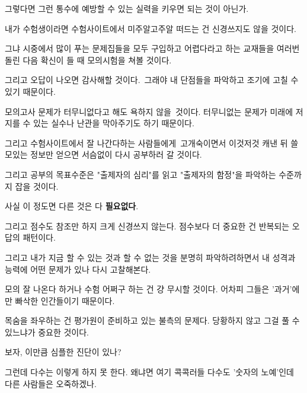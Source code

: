 그렇다면 그런 통수에 예방할 수 있는 실력을 키우면 되는 것이 아닌가.
\vspace{5mm}

내가 수험생이라면 수험사이트에서 미주알고주알 떠드는 건 신경쓰지도 않을 것이다.
\vspace{5mm}

그냐 시중에서 많이 푸는 문제집들을 모두 구입하고 어렵다라고 하는 교재들을 여러번 돌린 다음 확신이 들 때 모의시험을 쳐볼 것이다.
\vspace{5mm}

그리고 오답이 나오면 감사해할 것이다. 그래야 내 단점들을 파악하고 조기에 고칠 수 있기 때문이다.
\vspace{5mm}

모의고사 문제가 터무니없다고 해도 욕하지 않을 것이다. 터무니없는 문제가 미래에 저지를 수 있는 실수나 난관을 막아주기도 하기 때문이다.
\vspace{5mm}

그리고 수험사이트에서 잘 나간다하는 사람들에게 고개숙이면서 이것저것 캐낸 뒤 쓸모있는 정보만 얻으면 서슴없이 다시 공부하러 갈 것이다.
\vspace{5mm}

그리고 공부의 목표수준은 "출제자의 심리"를 읽고 "출제자의 함정"을 파악하는 수준까지 잡을 것이다.
\vspace{5mm}

사실 이 정도면 다른 것은 다 \textbf{필요없다}.
\vspace{5mm}

그리고 점수도 참조만 하지 크게 신경쓰지 않는다. 점수보다 더 중요한 건 반복되는 오답의 패턴이다.
\vspace{5mm}

그리고 내가 지금 할 수 있는 것과 할 수 없는 것을 분명히 파악하려하면서 내 성격과 능력에 어떤 문제가 있나 다시 고찰해본다.
\vspace{5mm}

모의 잘 나온다 하거나 수험 어쩌구 하는 건 걍 무시할 것이다. 어차피 그들은 '과거'에만 빠삭한 인간들이기 때문이다.
\vspace{5mm}

목숨을 좌우하는 건 평가원이 준비하고 있는 불측의 문제다. 당황하지 않고 그걸 풀 수 있느냐가 중요한 것이다.
\vspace{5mm}

보자, 이만큼 심플한 진단이 있나?
\vspace{5mm}

그런데 다수는 이렇게 하지 못 한다. 왜냐면 여기 콕콕러들 다수도 '숫자의 노예'인데 다른 사람들은 오죽하겠나.
\vspace{5mm}

